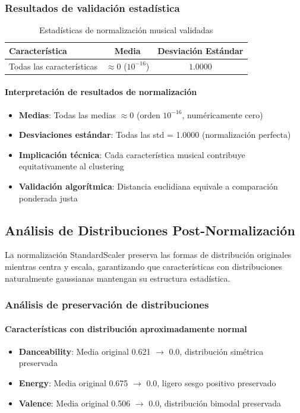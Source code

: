 \documentclass[12pt,a4paper]{report}
\begin{document}
\subsubsection{Resultados de validación estadística}

\begin{table}[h]
\centering
\caption{Estadísticas de normalización musical validadas}
\begin{tabular}{@{}lcc@{}}
\toprule
\textbf{Característica} & \textbf{Media} & \textbf{Desviación Estándar} \\
\midrule
Todas las características & $\approx 0$ ($10^{-16}$) & $1.0000$ \\
\bottomrule
\end{tabular}
\end{table}

\paragraph{Interpretación de resultados de normalización}
\begin{itemize}
    \item \textbf{Medias}: Todas las medias $\approx 0$ (orden $10^{-16}$, numéricamente cero)
    \item \textbf{Desviaciones estándar}: Todas las std = 1.0000 (normalización perfecta)
    \item \textbf{Implicación técnica}: Cada característica musical contribuye equitativamente al clustering
    \item \textbf{Validación algorítmica}: Distancia euclidiana equivale a comparación ponderada justa
\end{itemize}

\subsection{Análisis de Distribuciones Post-Normalización}

La normalización StandardScaler preserva las formas de distribución originales mientras centra y escala, garantizando que características con distribuciones naturalmente gaussianas mantengan su estructura estadística.

\subsubsection{Análisis de preservación de distribuciones}

\paragraph{Características con distribución aproximadamente normal}
\begin{itemize}
    \item \textbf{Danceability}: Media original 0.621 $\rightarrow$ 0.0, distribución simétrica preservada
    \item \textbf{Energy}: Media original 0.675 $\rightarrow$ 0.0, ligero sesgo positivo preservado
    \item \textbf{Valence}: Media original 0.506 $\rightarrow$ 0.0, distribución bimodal preservada
\end{itemize}
\end{document}
